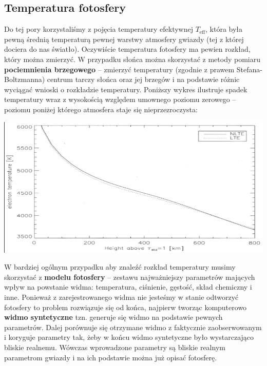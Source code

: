 \documentclass[../index.tex]{subfiles}
\begin{document}
        \subsection{Temperatura fotosfery}
            Do tej pory korzystaliśmy z pojęcia temperatury efektywnej \(T_\text{eff}\),  która była pewną średnią temperaturą pewnej warstwy atmosfery gwiazdy (tej z której dociera do nas światło). Oczywiście temperatura fotosfery ma pewien rozkład, który można zmierzyć. W przypadku słońca można skorzystać z metody pomiaru \textbf{pociemnienia brzegowego} \--- zmierzyć temperatury (zgodnie z prawem Stefana-Boltzmanna) centrum tarczy słońca oraz jej brzegów i na podstawie różnic wyciągać wnioski o rozkładzie temperatury. Poniższy wykres ilustruje spadek temperatury wraz z wysokością względem umownego poziomu zerowego \--- poziomu poniżej którego atmosfera staje się nieprzezroczysta:
            \begin{center}
                \includegraphics[width=16cm]{images/widmoFotosferySlonca.png}
            \end{center}
            W bardziej ogólnym przypadku aby znaleźć rozkład temperatury musimy skorzystać z \textbf{modelu fotosfery} \--- zestawu najważniejszy parametrów mających wpływ na powstanie widma: temperatura, ciśnienie, gęstość, skład chemiczny i inne. Ponieważ z zarejestrowanego widma nie jesteśmy w stanie odtworzyć fotosfery to problem rozwiązuje się od końca, najpierw tworząc komputerowo \textbf{widmo syntetyczne} tzn. generuje się widmo na podstawie pewnych parametrów. Dalej porównuje się otrzymane widmo z faktycznie zaobserwowanym i koryguje parametry tak, żeby w końcu widmo syntetyczne było wystarczająco bliskie realnemu. Wówczas wprowadzone parametry są bliskie realnym parametrom gwiazdy i na ich podstawie można już opisać fotosferę.
\end{document}
